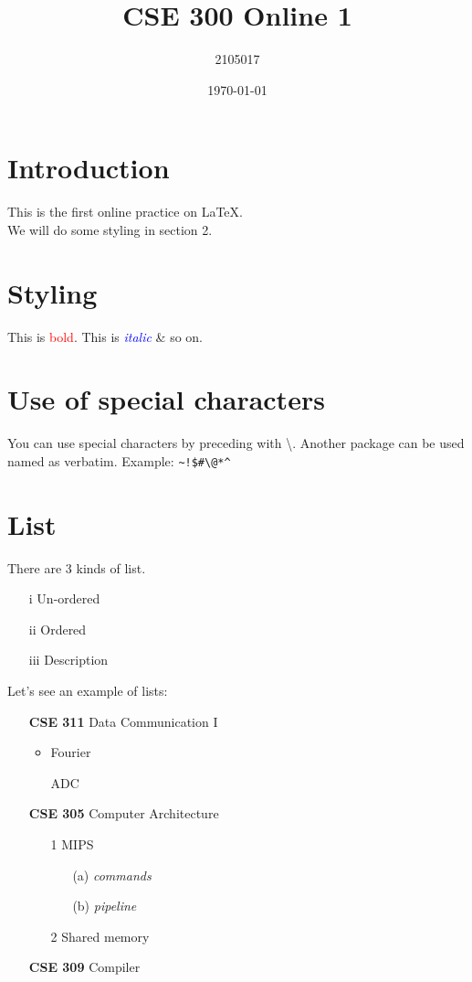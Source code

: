 \documentclass{article}
\title{CSE 300 Online 1}
\author{2105017}
\date{\today}
\begin{document}
\maketitle
\tableofcontents

\section{Introduction}
This is the first online practice on \LaTeX.\\
We will do some styling in section 2.
\section{Styling}
This is \textcolor{red}{bold}. This is \textit{\textcolor{blue}{italic}} \& so on.
\section*{Use of special characters}
You can use special characters by preceding with \textbackslash. Another package can be
used named as verbatim. Example: \verb|~!$#\@*^|
\section{List}
There are 3 kinds of list.
\begin{enumerate}
    \item[i] Un-ordered
    \item[ii] Ordered
    \item[iii] Description
\end{enumerate}
Let’s see an example of lists:
\begin{enumerate}
    \item[\textbf{CSE 311}] Data Communication I
    \begin{itemize}
        \item Fourier
        \item[] ADC
    \end{itemize}
    \item[\textbf{CSE 305}] Computer Architecture
    \begin{enumerate}
        \item[1] MIPS
        \begin{enumerate}
            \item[(a)] \textit{commands}
            \item[(b)] \textit{pipeline}
        \end{enumerate}
        \item[2] Shared memory
    \end{enumerate}
    \item[\textbf{CSE 309}] Compiler
\end{enumerate}
\end{document}
